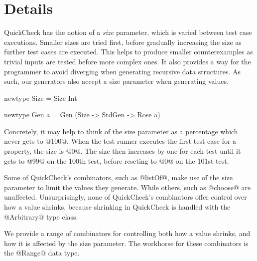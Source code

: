 \section{Details}

QuickCheck has the notion of a \emph{size} parameter, which is varied between test case executions. Smaller sizes are tried first, before gradually increasing the size as further test cases are executed. This helps to produce smaller counterexamples as trivial inputs are tested before more complex ones. It also provides a way for the programmer to avoid diverging when generating recursive data structures. As such, our generators also accept a size parameter when generating values. 

\begin{code}
  newtype Size =
    Size Int

  newtype Gen a =
    Gen (Size -> StdGen -> Rose a)
\end{code}

Concretely, it may help to think of the size parameter as a percentage which never gets to @100@. When the test runner executes the first test case for a property, the size is @0@. The size then increases by one for each test until it gets to @99@ on the 100th test, before reseting to @0@ on the 101st test.

%
%


Some of QuickCheck's combinators, such as @listOf@, make use of the size parameter to limit the values they generate. While others, such as @choose@ are unaffected. Unsurprisingly, none of QuickCheck's combinators offer control over how a value shrinks, because shrinking in QuickCheck is handled with the @Arbitrary@ type class.

We provide a range of combinators for controlling both how a value shrinks, and how it is affected by the size parameter. The workhorse for these combinators is the @Range@ data type.

